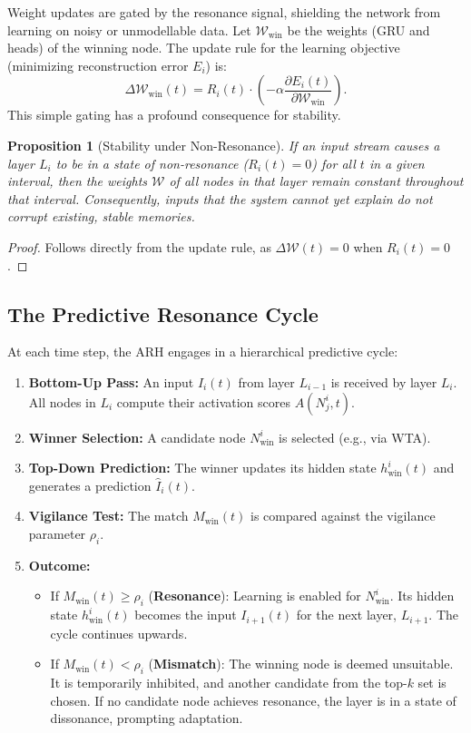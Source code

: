 \documentclass{article}
\newtheorem{proposition}[theorem]{Proposition}
\begin{document}
Weight updates are gated by the resonance signal, shielding the network from learning on noisy or unmodellable data. Let $\mathcal{W}_{\text{win}}$ be the weights (GRU and heads) of the winning node. The update rule for the learning objective (minimizing reconstruction error $E_i$) is:
\begin{equation}
    \Delta \mathcal{W}_{\text{win}}(t) = R_i(t) \cdot \left(-\alpha \frac{\partial E_i(t)}{\partial \mathcal{W}_{\text{win}}}\right).
\end{equation}
This simple gating has a profound consequence for stability.

\begin{proposition}[Stability under Non-Resonance]
If an input stream causes a layer $L_i$ to be in a state of non-resonance ($R_i(t)=0$) for all $t$ in a given interval, then the weights $\mathcal{W}$ of all nodes in that layer remain constant throughout that interval. Consequently, inputs that the system cannot yet explain do not corrupt existing, stable memories.
\end{proposition}
\begin{proof}
Follows directly from the update rule, as $\Delta\mathcal{W}(t)=0$ when $R_i(t)=0$.
\end{proof}

\subsection{The Predictive Resonance Cycle}
At each time step, the ARH engages in a hierarchical predictive cycle:
\begin{enumerate}
    \item \textbf{Bottom-Up Pass:} An input $I_i(t)$ from layer $L_{i-1}$ is received by layer $L_i$. All nodes in $L_i$ compute their activation scores $A(N_j^i, t)$.
    \item \textbf{Winner Selection:} A candidate node $N_{\text{win}}^i$ is selected (e.g., via WTA).
    \item \textbf{Top-Down Prediction:} The winner updates its hidden state $h_{\text{win}}^i(t)$ and generates a prediction $\hat{I}_i(t)$.
    \item \textbf{Vigilance Test:} The match $M_{\text{win}}(t)$ is compared against the vigilance parameter $\rho_i$.
    \item \textbf{Outcome:}
    \begin{itemize}
        \item If $M_{\text{win}}(t) \ge \rho_i$ (\textbf{Resonance}): Learning is enabled for $N_{\text{win}}^i$. Its hidden state $h_{\text{win}}^i(t)$ becomes the input $I_{i+1}(t)$ for the next layer, $L_{i+1}$. The cycle continues upwards.
        \item If $M_{\text{win}}(t) < \rho_i$ (\textbf{Mismatch}): The winning node is deemed unsuitable. It is temporarily inhibited, and another candidate from the top-$k$ set is chosen. If no candidate node achieves resonance, the layer is in a state of dissonance, prompting adaptation.
    \end{itemize}
\end{enumerate}
\end{document}
